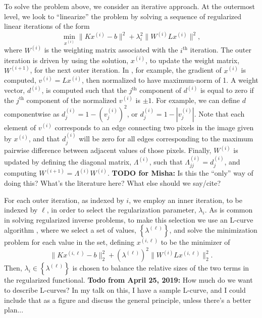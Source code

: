 To solve the problem above, we consider an iterative approach.  At the
outermost level, we look to ``linearize'' the problem by solving a
sequence of regularized linear iterations of the form
\begin{equation}
\label{eq:regularized}
\min_{x^{(i)}} \|Kx^{(i)}-b\|^2 + \lambda_i^2\|W^{(i)}Lx^{(i)}\|^2,
\end{equation}
where $W^{(i)}$ is the weighting matrix associated with the
$i^{\text{th}}$ iteration.  The outer iteration is driven by using the
solution, $x^{(i)}$, to update the weight matrix, $W^{(i+1)}$, for the
next outer iteration.  In \cite{OguzThesis, MishaSomething}, for
example, the gradient of $x^{(i)}$ is computed, $v^{(i)} = Lx^{(i)}$,
then normalized to have maximum-norm of 1.  A weight vector,
$d^{(i)}$, is computed such that the $j^{\text{th}}$ component of
$d^{(i)}$ is equal to zero if the $j^{\text{th}}$ component of the
normalized $v^{(i)}$ is $\pm 1$.  For example, we can define $d$
componentwise as $d^{(i)}_j = 1-\left(v^{(i)}_j\right)^2$, or
$d^{(i)}_j = 1-\left|v^{(i)}_j\right|$.  Note that each element of
$v^{(i)}$ corresponds to an edge connecting two pixels in the image
given by $x^{(i)}$, and that $d^{(i)}_j$ will be zero for all edges
corresponding to the maximum pairwise difference between adjacent
values of those pixels.  Finally, $W^{(i)}$ is updated by defining the
diagonal matrix, $\Lambda^{(i)}$, such that $\Lambda^{(i)}_{jj} =
d^{(i)}_j$, and computing $W^{(i+1)} = \Lambda^{(i)}W^{(i)}$.  {\bf
  TODO for Misha:} Is this the ``only'' way of doing this?  What's the
literature here?  What else should we say/cite?

For each outer iteration, as indexed by $i$, we employ an inner
iteration, to be indexed by $\ell$, in order to select the
regularization parameter, $\lambda_i$.  As is common in solving
regularized inverse problems, to make this selection we use an L-curve
algorithm \cite{Hansenbk}, where we select a set of values,
$\left\{\lambda^{(\ell)}\right\}$, and solve the minimization problem
for each value in the set, defining $x^{(i,\ell)}$ to be the minimizer
of
\begin{equation}
  \label{eq:defining_xil}
\|Kx^{(i,\ell)} - b\|_2^2 + \left(\lambda^{(\ell)}\right)^2\|W^{(i)}Lx^{(i,\ell)}\|_2^2.
\end{equation}
Then, $\lambda_i \in \left\{\lambda^{(\ell)}\right\}$ is chosen to
balance the relative sizes of the two terms in the regularized
functional.  {\bf Todo from April 25, 2019:} How much do we want to
describe L-curves?  In my talk on this, I have a sample L-curve, and I
could include that as a figure and discuss the general principle,
unless there's a better plan...

